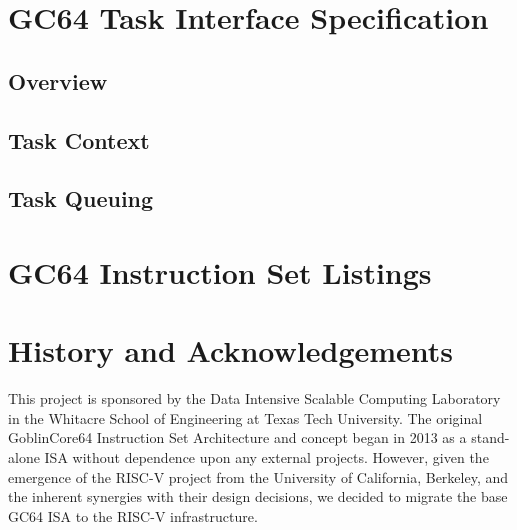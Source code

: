 \documentclass{article}
\begin{document}
\section{GC64 Task Interface Specification}

\subsection{Overview}

\subsection{Task Context}

\subsection{Task Queuing}

\section{GC64 Instruction Set Listings}


\section{History and Acknowledgements}

This project is sponsored by the Data Intensive Scalable Computing Laboratory in the Whitacre School of Engineering at Texas Tech University.  The original GoblinCore64 Instruction Set Architecture and concept began in 2013 as a stand-alone ISA without dependence upon any external projects.  However, given the emergence of the RISC-V project from the University of California, Berkeley, and the inherent synergies with their design decisions, we decided to migrate the base GC64 ISA to the RISC-V infrastructure.   
\end{document}
